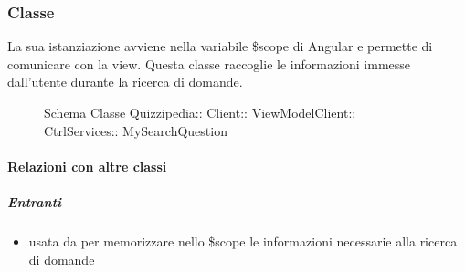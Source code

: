 \subsubsection{Classe }
La sua istanziazione avviene nella variabile \$scope di Angular e permette di comunicare con la view. Questa classe raccoglie le informazioni immesse dall'utente durante la ricerca di domande.
\begin{figure}[H]
\centering
\noindent{}
\caption[Schema Classe MySearchQuestion]{Schema Classe Quizzipedia:: Client:: ViewModelClient:: CtrlServices:: MySearchQuestion}
\end{figure}
\paragraph{Relazioni con altre classi}
\subparagraph{Entranti}
\begin{itemize}
\item usata da  per memorizzare nello \$scope le informazioni necessarie alla ricerca di domande
\end{itemize}
